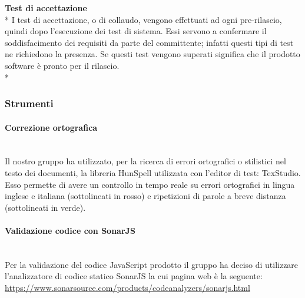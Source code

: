 \textbf{Test di accettazione} \\*
I test di accettazione, o di collaudo, vengono effettuati ad ogni pre-rilascio, quindi dopo l'esecuzione dei test di sistema. Essi servono a confermare il soddisfacimento dei requisiti da parte del committente; infatti questi tipi di test ne richiedono la presenza. Se questi test vengono superati significa che il prodotto software è pronto per il rilascio. \\*
\subsubsection{Strumenti}
	\paragraph{Correzione ortografica}\mbox{}\\ [1mm]
	Il nostro gruppo ha utilizzato, per la ricerca di errori ortografici o stilistici nel testo dei documenti, la libreria HunSpell utilizzata con l'editor di test: TexStudio. Esso permette di avere un controllo in tempo reale su errori ortografici in lingua inglese e italiana (sottolineati in rosso) e ripetizioni di parole a breve distanza (sottolineati in verde).
	\paragraph{Validazione codice con SonarJS}\mbox{}\\ [1mm]
	Per la validazione del codice JavaScript prodotto il gruppo ha deciso di utilizzare l'analizzatore di codice statico SonarJS la cui pagina web è la seguente: \\ \url{https://www.sonarsource.com/products/codeanalyzers/sonarjs.html}
